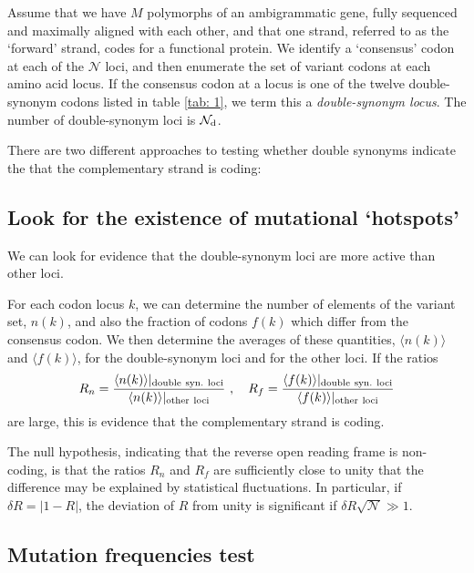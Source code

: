 \documentclass[unnumsec,webpdf,contemporary,large,namedate]{oup-authoring-template}%
\theoremstyle{thmstyleone}%
\theoremstyle{thmstyletwo}%
\theoremstyle{thmstylethree}%
\begin{document}
Assume that we have $M$ polymorphs of an ambigrammatic gene, fully sequenced and 
maximally aligned with each other, and that one strand, referred to as the 
\lq forward' strand, codes for a functional protein. 
We identify a \lq consensus' codon at each of the ${\mathcal N}$ loci, 
and then enumerate the set of variant codons at each amino acid locus. 
If the consensus codon at a locus is one of the twelve 
double-synonym codons listed in table \ref{tab: 1}, we term this a \emph{double-synonym locus}.
The number of double-synonym loci is ${\mathcal N}_{\rm d}$.

There are two different approaches to testing whether 
double synonyms indicate the that the complementary strand is coding:

\subsection{Look for the existence of mutational \lq hotspots'}
\label{sec: 3.1} 

We can look for evidence that the double-synonym loci are more active than other loci. 

For each codon locus $k$, we can determine the number of elements of the variant set, $n(k)$, 
and also the fraction of codons $f(k)$ which differ from the consensus codon. 
We then determine the averages of these quantities, $\langle n(k)\rangle$ and $\langle f(k)\rangle$, 
for the double-synonym loci and for the other loci. If the ratios
%
\begin{equation}
\label{eq: 3.1}
R_n=\frac{\langle n(k)\rangle\vert_{\rm double\ syn.\ loci}}{\langle n(k)\rangle\vert_{\rm other\ loci}}
\ ,\ \ \ 
R_f=\frac{\langle f(k)\rangle\vert_{\rm double\ syn.\ loci}}{\langle f(k)\rangle\vert_{\rm other\ loci}}
\end{equation}
%
are large, this is evidence that the complementary strand is coding. 

The null hypothesis, indicating that the reverse open reading frame is 
non-coding, is that the ratios $R_n$ and $R_f$ are sufficiently close to 
unity that the difference may be explained by statistical fluctuations. In particular,
if $\delta R=|1-R|$, the deviation of $R$ from unity is significant if 
$\delta R \sqrt{{\mathcal N}}\gg 1$.

\subsection{Mutation frequencies test}
\label{sec: 3.2}
\end{document}
